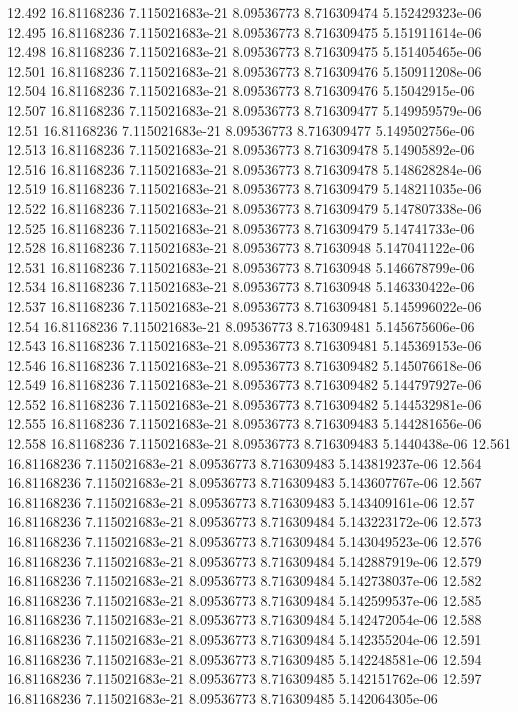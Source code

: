 {12.492 16.81168236 7.115021683e-21 8.09536773 8.716309474 5.152429323e-06
12.495 16.81168236 7.115021683e-21 8.09536773 8.716309475 5.151911614e-06
12.498 16.81168236 7.115021683e-21 8.09536773 8.716309475 5.151405465e-06
12.501 16.81168236 7.115021683e-21 8.09536773 8.716309476 5.150911208e-06
12.504 16.81168236 7.115021683e-21 8.09536773 8.716309476 5.15042915e-06
12.507 16.81168236 7.115021683e-21 8.09536773 8.716309477 5.149959579e-06
12.51 16.81168236 7.115021683e-21 8.09536773 8.716309477 5.149502756e-06
12.513 16.81168236 7.115021683e-21 8.09536773 8.716309478 5.14905892e-06
12.516 16.81168236 7.115021683e-21 8.09536773 8.716309478 5.148628284e-06
12.519 16.81168236 7.115021683e-21 8.09536773 8.716309479 5.148211035e-06
12.522 16.81168236 7.115021683e-21 8.09536773 8.716309479 5.147807338e-06
12.525 16.81168236 7.115021683e-21 8.09536773 8.716309479 5.14741733e-06
12.528 16.81168236 7.115021683e-21 8.09536773 8.71630948 5.147041122e-06
12.531 16.81168236 7.115021683e-21 8.09536773 8.71630948 5.146678799e-06
12.534 16.81168236 7.115021683e-21 8.09536773 8.71630948 5.146330422e-06
12.537 16.81168236 7.115021683e-21 8.09536773 8.716309481 5.145996022e-06
12.54 16.81168236 7.115021683e-21 8.09536773 8.716309481 5.145675606e-06
12.543 16.81168236 7.115021683e-21 8.09536773 8.716309481 5.145369153e-06
12.546 16.81168236 7.115021683e-21 8.09536773 8.716309482 5.145076618e-06
12.549 16.81168236 7.115021683e-21 8.09536773 8.716309482 5.144797927e-06
12.552 16.81168236 7.115021683e-21 8.09536773 8.716309482 5.144532981e-06
12.555 16.81168236 7.115021683e-21 8.09536773 8.716309483 5.144281656e-06
12.558 16.81168236 7.115021683e-21 8.09536773 8.716309483 5.1440438e-06
12.561 16.81168236 7.115021683e-21 8.09536773 8.716309483 5.143819237e-06
12.564 16.81168236 7.115021683e-21 8.09536773 8.716309483 5.143607767e-06
12.567 16.81168236 7.115021683e-21 8.09536773 8.716309483 5.143409161e-06
12.57 16.81168236 7.115021683e-21 8.09536773 8.716309484 5.143223172e-06
12.573 16.81168236 7.115021683e-21 8.09536773 8.716309484 5.143049523e-06
12.576 16.81168236 7.115021683e-21 8.09536773 8.716309484 5.142887919e-06
12.579 16.81168236 7.115021683e-21 8.09536773 8.716309484 5.142738037e-06
12.582 16.81168236 7.115021683e-21 8.09536773 8.716309484 5.142599537e-06
12.585 16.81168236 7.115021683e-21 8.09536773 8.716309484 5.142472054e-06
12.588 16.81168236 7.115021683e-21 8.09536773 8.716309484 5.142355204e-06
12.591 16.81168236 7.115021683e-21 8.09536773 8.716309485 5.142248581e-06
12.594 16.81168236 7.115021683e-21 8.09536773 8.716309485 5.142151762e-06
12.597 16.81168236 7.115021683e-21 8.09536773 8.716309485 5.142064305e-06
}
